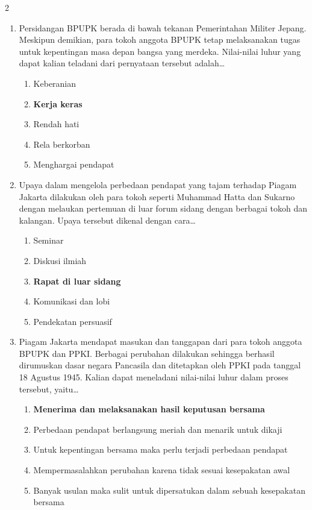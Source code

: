 \documentclass[10pt,a4paper]{article}
\begin{document}
\begin{multicols}{2}
\begin{enumerate}
  \item Persidangan BPUPK berada di bawah tekanan Pemerintahan Militer Jepang. Meskipun demikian, para tokoh anggota BPUPK tetap melaksanakan tugas untuk kepentingan masa depan bangsa yang merdeka. Nilai-nilai luhur yang dapat kalian teladani dari pernyataan tersebut adalah\dots
    \begin{enumerate}
    \item Keberanian
    \item \textbf{Kerja keras}
    \item Rendah hati
    \item Rela berkorban
    \item Menghargai pendapat
    \end{enumerate}

  \item Upaya dalam mengelola perbedaan pendapat yang tajam terhadap Piagam Jakarta dilakukan oleh para tokoh seperti Muhammad Hatta dan Sukarno dengan melaukan pertemuan di luar forum sidang dengan berbagai tokoh dan kalangan. Upaya tersebut dikenal dengan cara\dots
    \begin{enumerate}
    \item Seminar
    \item Diskusi ilmiah
    \item \textbf{Rapat di luar sidang}
    \item Komunikasi dan lobi
    \item Pendekatan persuasif
    \end{enumerate}

  \item Piagam Jakarta mendapat masukan dan tanggapan dari para tokoh anggota BPUPK dan PPKI. Berbagai perubahan dilakukan sehingga berhasil dirumuskan dasar negara Pancasila dan ditetapkan oleh PPKI pada tanggal 18 Agustus 1945. Kalian dapat meneladani nilai-nilai luhur dalam proses tersebut, yaitu\dots
    \begin{enumerate}
    \item \textbf{Menerima dan melaksanakan hasil keputusan bersama}
    \item Perbedaan pendapat berlangsung meriah dan menarik untuk dikaji
    \item Untuk kepentingan bersama maka perlu terjadi perbedaan pendapat
    \item Mempermasalahkan perubahan karena tidak sesuai kesepakatan awal
    \item Banyak usulan maka sulit untuk dipersatukan dalam sebuah kesepakatan bersama
    \end{enumerate}


\end{enumerate}
\end{multicols}
\end{document}
